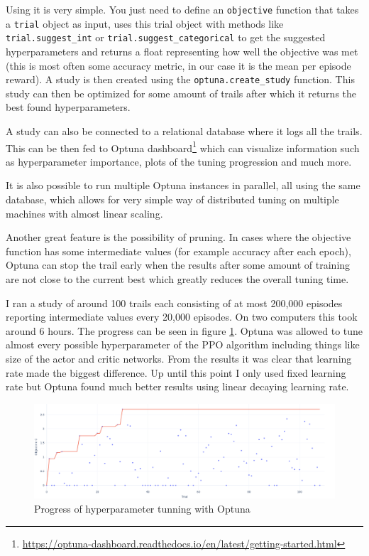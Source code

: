 \documentclass[
  digital,     %
  oneside,     %
  nosansbold,  %
  nocolorbold, %
  lof,         %
  lot,         %
]{fithesis4}
\begin{document}
Using it is very simple. You just need to define an \texttt{objective} function that takes a \texttt{trial} object as input, uses this trial object with methods like \texttt{trial.suggest\_int} or \texttt{trial.suggest\_categorical} to get the suggested hyperparameters and returns a float representing how well the objective was met (this is most often some accuracy metric, in our case it is the mean per episode reward). A study is then created using the \texttt{optuna.create\_study} function. This study can then be optimized for some amount of trails after which it returns the best found hyperparameters.

A study can also be connected to a relational database where it logs all the trails. This can be then fed to Optuna dashboard\footnote{\url{https://optuna-dashboard.readthedocs.io/en/latest/getting-started.html}} which can visualize information such as hyperparameter importance, plots of the tuning progression and much more.

It is also possible to run multiple Optuna instances in parallel, all using the same database, which allows for very simple way of distributed tuning on multiple machines with almost linear scaling.

Another great feature is the possibility of pruning. In cases where the objective function has some intermediate values (for example accuracy after each epoch), Optuna can stop the trail early when the results after some amount of training are not close to the current best which greatly reduces the overall tuning time.

I ran a study of around 100 trails each consisting of at most 200,000 episodes reporting intermediate values every 20,000 episodes. On two computers this took around 6 hours. The progress can be seen in figure \ref{fig:optuna-progress}. Optuna was allowed to tune almost every possible hyperparameter of the PPO algorithm including things like size of the actor and critic networks. From the results it was clear that learning rate made the biggest difference. Up until this point I only used fixed learning rate but Optuna found much better results using linear decaying learning rate.

\begin{figure}
    \centering
    \includegraphics[width=1\linewidth]{diagrams/optuna_progress.png}
    \caption{Progress of hyperparameter tunning with Optuna}
    \label{fig:optuna-progress}
\end{figure}
\end{document}
